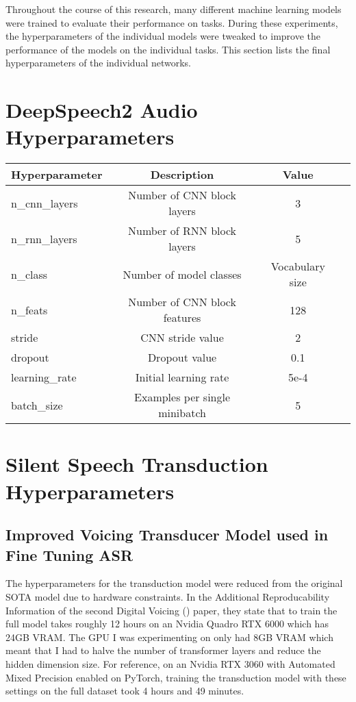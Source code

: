 Throughout the course of this research, many different machine learning models were
trained to evaluate their performance on tasks. During these experiments,
the hyperparameters of the individual models were tweaked to improve the performance of
the models on the individual tasks. This section lists the final hyperparameters of
the individual networks.

\section{DeepSpeech2 Audio Hyperparameters}


{\small\begin{center}
\begin{tabular} { | l | c | c | c | }
\hline
Hyperparameter & Description & Value \\
\hline
n\_cnn\_layers & Number of CNN block layers & 3 \\
n\_rnn\_layers & Number of RNN block layers & 5 \\
n\_class & Number of model classes & Vocabulary size \\
n\_feats & Number of CNN block features & 128 \\
stride & CNN stride value & 2 \\
dropout & Dropout value & 0.1 \\
learning\_rate & Initial learning rate & 5e-4 \\
batch\_size & Examples per single minibatch & 5 \\
\hline
\end{tabular}
\end{center}}

\section{Silent Speech Transduction Hyperparameters}

\subsection{Improved Voicing Transducer Model used in Fine Tuning ASR}

The hyperparameters for the transduction model were reduced from the original
SOTA model due to hardware constraints. In the Additional Reproducability
Information of the second Digital Voicing (\cite{gaddy2021improved}) paper, they state
that to train the full model takes roughly 12 hours on an Nvidia Quadro RTX 6000
which has 24GB VRAM. The GPU I was experimenting on only had 8GB VRAM which meant
that I had to halve the number of transformer layers and reduce the hidden dimension
size. For reference, on an Nvidia RTX 3060 with Automated Mixed Precision enabled
on PyTorch, training the transduction model with these settings on the full dataset 
took 4 hours and 49 minutes.

